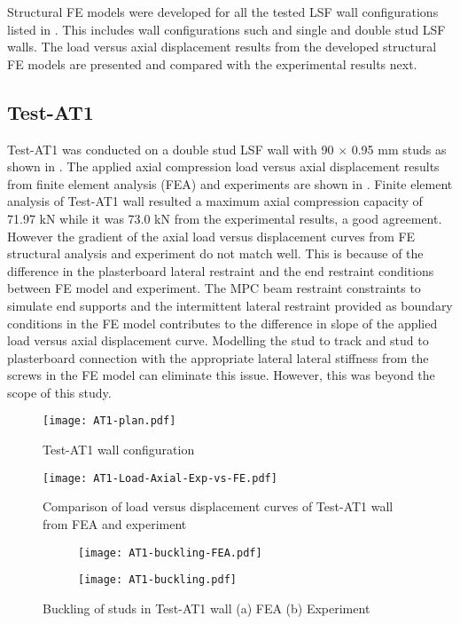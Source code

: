 Structural FE models were developed for all the tested LSF wall configurations listed in . This includes wall configurations such and single and double stud LSF walls. The load versus axial displacement results from the developed structural FE models are presented and compared with the experimental results next.  

\subsection*{Test-AT1}

Test-AT1 was conducted on a double stud LSF wall with 90 $\times$ 0.95 mm studs as shown in . The applied axial compression load versus axial displacement results from finite element analysis (FEA) and experiments are shown in . Finite element analysis of Test-AT1 wall resulted a maximum axial compression capacity of 71.97 kN while it was 73.0 kN from the experimental results, a good agreement. However the gradient of the axial load versus displacement curves from FE structural analysis and experiment do not match well. This is because of the difference in the plasterboard lateral restraint and the end restraint conditions between FE model and experiment. The MPC beam restraint constraints to simulate end supports and the intermittent lateral restraint provided as boundary conditions in the FE model contributes to the difference in slope of the applied load versus axial displacement curve. Modelling the stud to track and stud to plasterboard connection with the appropriate lateral lateral stiffness from the screws in the FE model can eliminate this issue. However, this was beyond the scope of this study.   
\begin{figure}[!htbp]
	\centering
			\texttt{[image: AT1-plan.pdf]}\\
		\caption{Test-AT1 wall configuration}
		\label{fig:AT1-plan-fea}
\end{figure}
\begin{figure}[!htbp]
	\centering
			\texttt{[image: AT1-Load-Axial-Exp-vs-FE.pdf]}\\
		\caption{Comparison of load versus displacement curves of Test-AT1 wall from FEA and experiment}
		\label{fig:AT1-fea-results}
\end{figure}
\begin{figure}[!htbp]
	\centering
	\begin{subfigure}[b]{0.4\textwidth}
		\centering
		\texttt{[image: AT1-buckling-FEA.pdf]}
		\caption{}
		\label{subfig:AT1-buckling-FEA}
	\end{subfigure}
	\begin{subfigure}[b]{0.4\textwidth}
		\centering
		\texttt{[image: AT1-buckling.pdf]}
		\caption{}
		\label{subfig:AT1-buckling-experiment}
	\end{subfigure}
	   \caption{Buckling of studs in Test-AT1 wall (a) FEA (b) Experiment}
	   \label{fig:AT1-buckling-fea-comparison}
\end{figure} 

